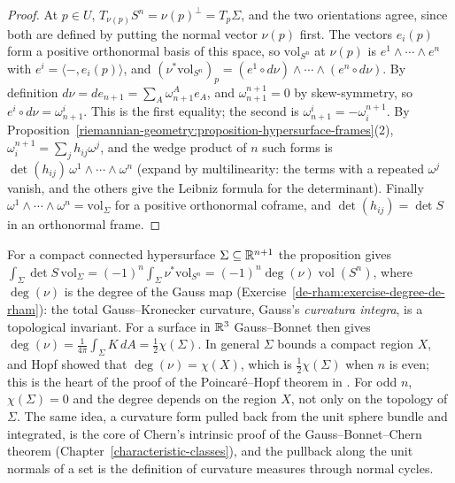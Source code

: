 \begin{proof}
At $p \in U$, $T_{\nu(p)}S^n = \nu(p)^\perp = T_p\Sigma$, and the two orientations agree, since both are defined by putting the normal vector $\nu(p)$ first. The vectors $e_i(p)$ form a positive orthonormal basis of this
space, so $\mathrm{vol}_{S^n}$ at $\nu(p)$ is $e^1 \wedge \cdots \wedge e^n$ with $e^i = \langle -, e_i(p)\rangle$, and
$(\nu^*\mathrm{vol}_{S^n})_p = (e^1 \circ d\nu) \wedge \cdots \wedge (e^n \circ d\nu)$. By definition $d\nu = de_{n+1} = \sum_A\omega^A_{n+1}e_A$, and $\omega^{n+1}_{n+1} = 0$ by skew-symmetry, so
$e^i \circ d\nu = \omega^i_{n+1}$. This is the first equality; the second is $\omega^i_{n+1} = -\omega^{n+1}_i$. By Proposition~\ref{riemannian-geometry:proposition-hypersurface-frames}(2),
$\omega^{n+1}_i = \sum_jh_{ij}\omega^j$, and the wedge product of $n$ such forms is $\det(h_{ij})\,\omega^1 \wedge \cdots \wedge \omega^n$ (expand by multilinearity: the terms with a repeated $\omega^j$ vanish, and the others give the Leibniz formula for the determinant). Finally
$\omega^1 \wedge \cdots \wedge \omega^n = \mathrm{vol}_\Sigma$ for a positive orthonormal coframe, and $\det(h_{ij}) = \det S$ in an orthonormal frame.
\end{proof}

\begin{remark}\label{riemannian-geometry:remark-curvatura-integra}
For a compact connected hypersurface $\Sigma \subseteq \mathbb{R}^{n+1}$ the proposition gives $\int_\Sigma\det S\,\mathrm{vol}_\Sigma = (-1)^n\int_\Sigma\nu^*\mathrm{vol}_{S^n} = (-1)^n\deg(\nu)\operatorname{vol}(S^n)$, where $\deg(\nu)$ is the degree of
the Gauss map (Exercise~\ref{de-rham:exercise-degree-de-rham}): the total Gauss--Kronecker curvature, Gauss's \emph{curvatura integra}, is a topological invariant. For a surface in $\mathbb{R}^3$ Gauss--Bonnet then gives
$\deg(\nu) = \frac{1}{4\pi}\int_\Sigma K\,dA = \frac12\chi(\Sigma)$. In general $\Sigma$ bounds a compact region $X$, and Hopf showed that $\deg(\nu) = \chi(X)$, which is $\frac12\chi(\Sigma)$ when $n$ is even;
this is the heart of the proof of the Poincar\'e--Hopf theorem in \cite{milnor-differential-viewpoint}. For odd $n$, $\chi(\Sigma) = 0$ and the degree depends on the region $X$, not only on the topology of $\Sigma$. The same idea, a curvature form pulled back from the unit sphere bundle and integrated, is the core of Chern's intrinsic
proof of the Gauss--Bonnet--Chern theorem (Chapter~\ref{characteristic-classes}), and the pullback along the unit normals of a set is the definition of curvature measures through normal cycles.
\end{remark}

